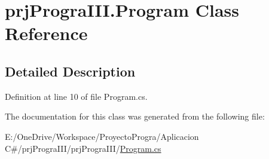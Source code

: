 \hypertarget{classprj_progra_i_i_i_1_1_program}{}\section{prj\+Progra\+I\+I\+I.\+Program Class Reference}
\label{classprj_progra_i_i_i_1_1_program}


\subsection{Detailed Description}


Definition at line 10 of file Program.\+cs.



The documentation for this class was generated from the following file\+:\begin{DoxyCompactItemize}
\item 
E\+:/\+One\+Drive/\+Workspace/\+Proyecto\+Progra/\+Aplicacion C\#/prj\+Progra\+I\+I\+I/prj\+Progra\+I\+I\+I/\hyperlink{_program_8cs}{Program.\+cs}\end{DoxyCompactItemize}
